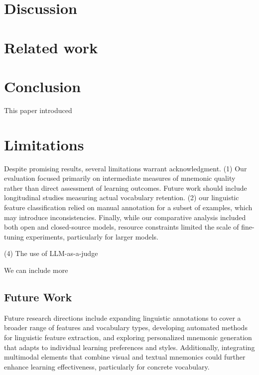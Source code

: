 \section{Discussion}


\section{Related work} \label{sec:related-work}


\section{Conclusion} \label{sec:conclusion}
This paper introduced

\section{Limitations} \label{sec:limitations}
Despite promising results, several limitations warrant acknowledgment. (1) Our evaluation focused primarily on intermediate measures of mnemonic quality rather than direct assessment of learning outcomes. Future work should include longitudinal studies measuring actual vocabulary retention. (2) our linguistic feature classification relied on manual annotation for a subset of examples, which may introduce inconsistencies. Finally, while our comparative analysis included both open and closed-source models, resource constraints limited the scale of fine-tuning experiments, particularly for larger models.

(4) The use of LLM-as-a-judge

We can include more

\subsection{Future Work} \label{sec:future-work}
Future research directions include expanding linguistic annotations to cover a broader range of features and vocabulary types, developing automated methods for linguistic feature extraction, and exploring personalized mnemonic generation that adapts to individual learning preferences and styles. Additionally, integrating multimodal elements that combine visual and textual mnemonics could further enhance learning effectiveness, particularly for concrete vocabulary.
